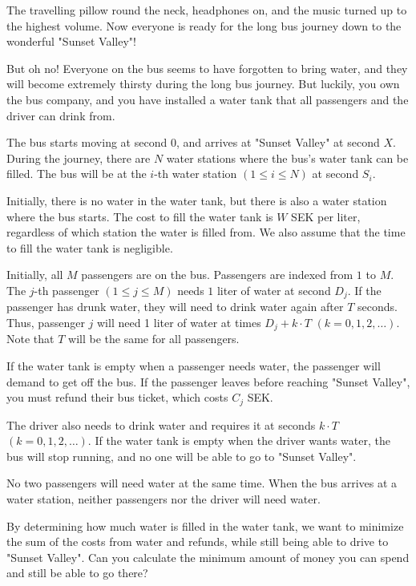 \noindent
The travelling pillow round the neck, headphones on, and the music turned up to the highest volume.
Now everyone is ready for the long bus journey down to the wonderful "Sunset Valley"!

But oh no! Everyone on the bus seems to have forgotten to bring water,
and they will become extremely thirsty during the long bus journey.
But luckily, you own the bus company,
and you have installed a water tank that all passengers and the driver can drink from.

The bus starts moving at second $0$, and arrives at "Sunset Valley" at second $X$.
During the journey, there are $N$ water stations where the bus's water tank can be filled.
The bus will be at the $i$-th water station $(1 \leq i \leq N)$ at second $S_i$.

Initially, there is no water in the water tank, but there is also a water station where the bus starts.
The cost to fill the water tank is $W$ SEK per liter, regardless of which station the water is filled from.
We also assume that the time to fill the water tank is negligible.

Initially, all $M$ passengers are on the bus. Passengers are indexed from $1$ to $M$.
The $j$-th passenger $(1 \leq j \leq M)$ needs $1$ liter of water at second $D_j$.
If the passenger has drunk water, they will need to drink water again after $T$ seconds.
Thus, passenger $j$ will need 1 liter of water at times $D_j + k\cdot T$ $(k = 0,1,2,\ldots)$.
Note that $T$ will be the same for all passengers.

If the water tank is empty when a passenger needs water, the passenger will demand to get off the bus.
If the passenger leaves before reaching "Sunset Valley", you must refund their bus ticket,
which costs $C_j$ SEK.

The driver also needs to drink water and requires it at seconds $k\cdot T$ $(k = 0,1,2,\ldots)$.
If the water tank is empty when the driver wants water, the bus will stop running, and no one will be able to go to "Sunset Valley".

No two passengers will need water at the same time. When the bus arrives at a water station, neither passengers nor the driver will need water.

By determining how much water is filled in the water tank, we want to minimize the sum of the costs from water and refunds, 
while still being able to drive to "Sunset Valley". Can you calculate the minimum amount of money you can spend and still be able to go there?


